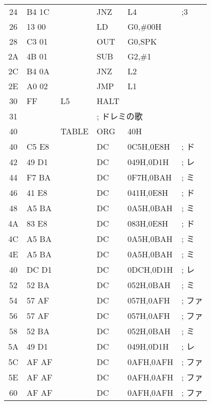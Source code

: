 \begin{figure}[btp]
{\begin{center}
\begin{tabular}{|c|l|l|l l l|}
24 & B4 1C        &         & JNZ    & L4          &   ;3       \\
26 & 13 00        &         & LD     & G0,\#00H    &            \\
28 & C3 01        &         & OUT    & G0,SPK      &   	        \\
2A & 4B 01        &         & SUB    & G2,\#1      &   	        \\
2C & B4 0A        &         & JNZ    & L2          &   	        \\
2E & A0 02        &         & JMP    & L1          &   	        \\
30 & FF           &  L5     & HALT   &             &            \\
31 &              &         & \multicolumn{3}{|l|}{; ドレミの歌} \\
40 &              &  TABLE  & ORG    & 40H         &       \\
40 & C5 E8        &         & DC     & 0C5H,0E8H   &   ; ド\\
42 & 49 D1        &         & DC     & 049H,0D1H   &   ; レ\\
44 & F7 BA        &         & DC     & 0F7H,0BAH   &   ; ミ\\
46 & 41 E8        &         & DC     & 041H,0E8H   &   ; ド\\
48 & A5 BA        &         & DC     & 0A5H,0BAH   &   ; ミ\\
4A & 83 E8        &         & DC     & 083H,0E8H   &   ; ド\\
4C & A5 BA        &         & DC     & 0A5H,0BAH   &   ; ミ\\
4E & A5 BA        &         & DC     & 0A5H,0BAH   &   ; ミ\\
40 & DC D1        &         & DC     & 0DCH,0D1H   &   ; レ\\
52 & 52 BA        &         & DC     & 052H,0BAH   &   ; ミ\\
54 & 57 AF        &         & DC     & 057H,0AFH   &   ; ファ\\
56 & 57 AF        &         & DC     & 057H,0AFH   &   ; ファ\\
58 & 52 BA        &         & DC     & 052H,0BAH   &   ; ミ\\
5A & 49 D1        &         & DC     & 049H,0D1H   &   ; レ\\
5C & AF AF        &         & DC     & 0AFH,0AFH   &   ; ファ\\
5E & AF AF        &         & DC     & 0AFH,0AFH   &   ; ファ\\
60 & AF AF        &         & DC     & 0AFH,0AFH   &   ; ファ\\

\end{tabular}
\end{center}}
\end{figure}
